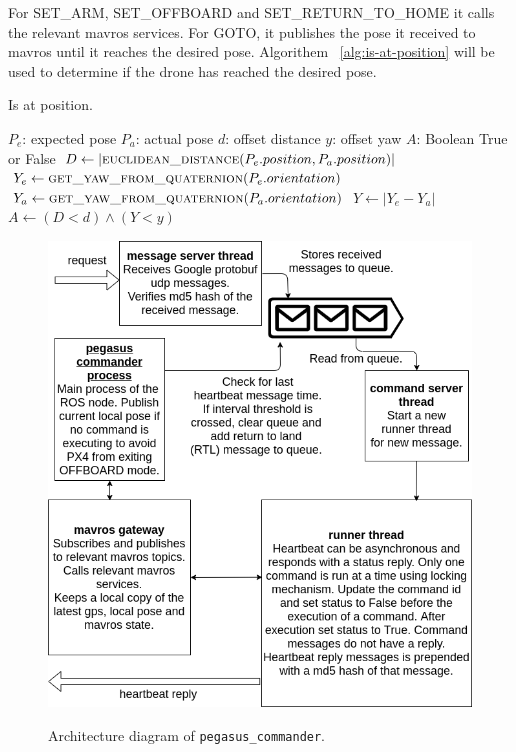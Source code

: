 For SET\_ARM, SET\_OFFBOARD and SET\_RETURN\_TO\_HOME it calls the relevant mavros services. For GOTO, it publishes the pose it received to mavros until it reaches the desired pose. Algorithem ~\ref{alg:is-at-position} will be used to determine if the drone has reached the desired pose.

\renewcommand{\algorithmicrequire}{\textbf{Input:}}
\renewcommand{\algorithmicensure}{\textbf{Output:}}
\renewcommand{\algorithmicforall}{\textbf{for each}}
\begin{algorithm}
	\caption{Is at position.}
	\label{alg:is-at-position}
	\begin{algorithmic}
		\REQUIRE $P_e$: expected pose 
		\REQUIRE $P_a$: actual pose
		\REQUIRE $d$: offset distance
		\REQUIRE $y$: offset yaw
		\ENSURE $A$: Boolean True or False 
		\STATE $D \gets |\textsc{euclidean\_distance}(P_e.position, P_a.position)|$
		\STATE $Y_e \gets \textsc{get\_yaw\_from\_quaternion}(P_e.orientation) $
		\STATE $Y_a \gets \textsc{get\_yaw\_from\_quaternion}(P_a.orientation) $
		\STATE $Y \gets |Y_e - Y_a|$
		\STATE $A \gets (D < d) \land (Y < y)$
	\end{algorithmic}
\end{algorithm}

\begin{figure}
	\centering
	\caption[Architecture diagram of\texttt{ pegasus\_commander}.]{\small Architecture diagram of \texttt{pegasus\_commander}.} 
	\includegraphics[width=5in]{figures/methodology/methodology-pegasus-commander}
	\label{fig:pegasus-commander}
\end{figure}

